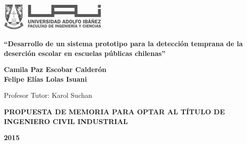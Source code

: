 \begin{titlepage}
\includegraphics[width=0.4\textwidth]{UAI}
    \begin{center}
        \vspace*{5cm}
        
        \textbf{“Desarrollo de un sistema prototipo para la detección temprana de la deserción escolar en escuelas públicas chilenas”}
        
        \vspace{4cm}

        
        \textbf{Camila Paz Escobar Calderón}\\
        \textbf{Felipe Elías Lolas Isuani}\\
        \begin{flushright}
        Profesor Tutor: Karol Suchan
        \end{flushright}
        \vfill
        
        \textbf{PROPUESTA DE MEMORIA PARA OPTAR AL TÍTULO DE INGENIERO CIVIL INDUSTRIAL}

        
        \vspace{0.8cm}
        
 
        \textbf{2015}
        
    \end{center}
\end{titlepage}
